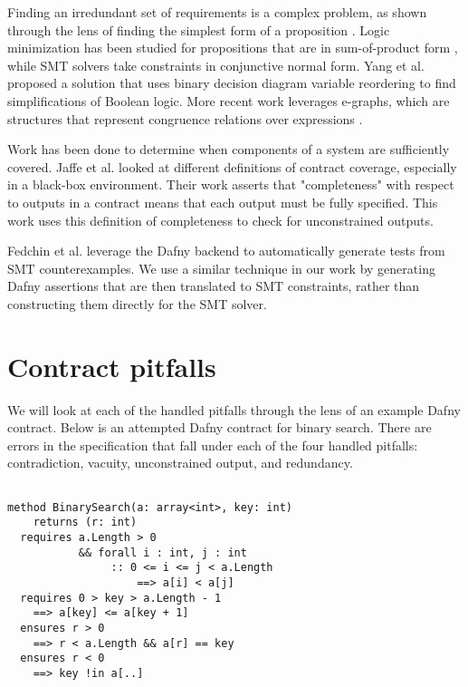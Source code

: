 \documentclass[sigplan,screen,anonymous]{acmart}
\begin{document}
Finding an irredundant set of requirements is a complex problem, as shown through the lens of finding the simplest form of a proposition \cite{umans2006complexity}. Logic minimization has been studied for propositions that are in sum-of-product form \cite{coudert1994two}, while SMT solvers take constraints in conjunctive normal form. Yang et al. \cite{yang2000bds} proposed a solution that uses binary decision diagram \cite{akers1978functional} variable reordering to find simplifications of Boolean logic. More recent work leverages e-graphs, which are structures that represent congruence relations over expressions \cite{nelson1980fast}.

Work has been done to determine when components of a system are sufficiently covered. Jaffe et al. \cite{jaffe1989completeness} looked at different definitions of contract coverage, especially in a black-box environment. Their work asserts that "completeness" with respect to outputs in a contract means that each output must be fully specified. This work uses this definition of completeness to check for unconstrained outputs.

Fedchin et al. \cite{fedchin2023toolkit} leverage the Dafny backend to automatically generate tests from SMT counterexamples. We use a similar technique in our work by generating Dafny assertions that are then translated to SMT constraints, rather than constructing them directly for the SMT solver.

\section{Contract pitfalls}

We will look at each of the handled pitfalls through the lens of an example Dafny contract. Below is an attempted Dafny contract for binary search. There are errors in the specification that fall under each of the four handled pitfalls: contradiction, vacuity, unconstrained output, and redundancy.

\begin{lstlisting}[language=dafny]

method BinarySearch(a: array<int>, key: int)
    returns (r: int)
  requires a.Length > 0
           && forall i : int, j : int
                :: 0 <= i <= j < a.Length
                    ==> a[i] < a[j]
  requires 0 > key > a.Length - 1
    ==> a[key] <= a[key + 1]
  ensures r > 0
    ==> r < a.Length && a[r] == key
  ensures r < 0
    ==> key !in a[..]

\end{lstlisting}
\end{document}
